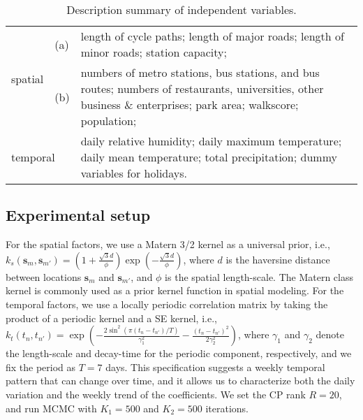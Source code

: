 \documentclass[12pt]{article}
\newcommand{\bd}[1]{\boldsymbol{#1}}
\begin{document}
\begin{table}[!ht]
\footnotesize
    \centering
    \caption{Description summary of independent variables.}
    \begin{tabular}{ll|p{13cm}}
    \toprule
    \multirow{2}{*}{spatial} & (a) & length of cycle paths; length of major roads; length of minor roads; station capacity; \\
    \cmidrule(r){2-3}
    & (b) & numbers of metro stations, bus stations, and bus routes; numbers of restaurants, universities, other business \& enterprises; park area; walkscore; population; \\
    \midrule
    \multicolumn{2}{l|}{temporal}  & daily relative humidity; daily maximum temperature;  daily mean temperature; total precipitation; dummy variables for holidays. \\
    \bottomrule
    \end{tabular}
    \label{tab:variables}
\end{table}

\subsection{Experimental setup}

For the spatial factors, we use a Matern 3/2 kernel as a universal prior, i.e., $k_s(\bd{s}_{m},\bd{s}_{m'})=\left(1+\frac{\sqrt{3}d}{\phi}\right)\exp{\left(-\frac{\sqrt{3}d}{\phi}\right)}$, where $d$ is the haversine distance between locations $\boldsymbol{s}_{m}$ and $\boldsymbol{s}_{m'}$, and $\phi$ is the spatial length-scale. The Matern class kernel is commonly used as a prior kernel function in spatial modeling. For the temporal factors, we use a locally periodic correlation matrix by taking the product of a periodic kernel and a SE kernel, i.e., $k_t(t_{n},t_{n'})=\exp{\left(-\frac{2\sin^2{(\pi(t_n-t_{n'})/T)}}{\gamma_{1}^{2}}-\frac{(t_n-t_{n'})^2}{2\gamma_{2}^{2}}\right)}$, where $\gamma_1$ and $\gamma_2$ denote the length-scale and decay-time for the periodic component, respectively, and we fix the period as $T=7$ days. This specification  suggests a weekly temporal pattern that can change over time, and it allows us to characterize both the daily variation and the weekly trend of the coefficients. We set the CP rank $R=20$, and run MCMC with  $K_1=500$ and $K_2=500$ iterations. 
\end{document}
